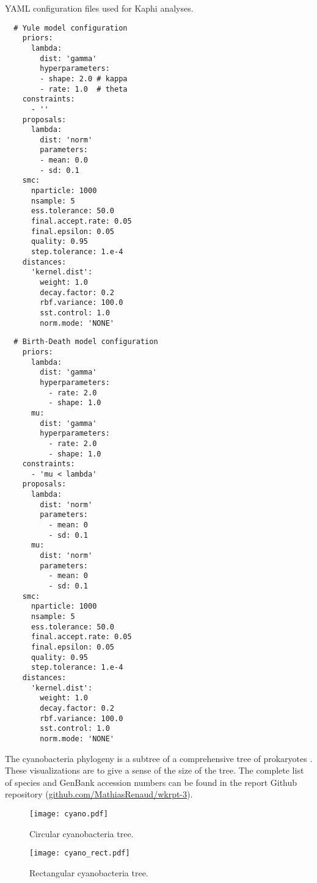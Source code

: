 \documentclass[12pt]{article}
\begin{document}
    
\newpage



\newpage


YAML configuration files used for Kaphi analyses.
\begin{verbatim}
  # Yule model configuration
    priors:
      lambda:
        dist: 'gamma'
        hyperparameters:
        - shape: 2.0 # kappa
        - rate: 1.0  # theta
    constraints:
      - ''
    proposals:
      lambda:
        dist: 'norm'
        parameters:
        - mean: 0.0
        - sd: 0.1
    smc:
      nparticle: 1000
      nsample: 5
      ess.tolerance: 50.0
      final.accept.rate: 0.05
      final.epsilon: 0.05
      quality: 0.95
      step.tolerance: 1.e-4
    distances:
      'kernel.dist':
        weight: 1.0
        decay.factor: 0.2
        rbf.variance: 100.0
        sst.control: 1.0
        norm.mode: 'NONE'
\end{verbatim}

\begin{verbatim}
  # Birth-Death model configuration
    priors:
      lambda:
        dist: 'gamma'
        hyperparameters:
          - rate: 2.0
          - shape: 1.0
      mu:
        dist: 'gamma'
        hyperparameters:
          - rate: 2.0
          - shape: 1.0
    constraints:
      - 'mu < lambda'
    proposals:
      lambda:
        dist: 'norm'
        parameters:
          - mean: 0
          - sd: 0.1
      mu:
        dist: 'norm'
        parameters:
          - mean: 0
          - sd: 0.1
    smc:
      nparticle: 1000
      nsample: 5
      ess.tolerance: 50.0
      final.accept.rate: 0.05
      final.epsilon: 0.05
      quality: 0.95  
      step.tolerance: 1.e-4
    distances:
      'kernel.dist':
        weight: 1.0
        decay.factor: 0.2
        rbf.variance: 100.0
        sst.control: 1.0
        norm.mode: 'NONE'
\end{verbatim}

The cyanobacteria phylogeny is a subtree of a comprehensive tree of prokaryotes \cite{marin2016timetree}. These visualizations are to give a sense of the size of the tree. The complete list of species and GenBank accession numbers can be found in the report Github repository (\url{github.com/MathiasRenaud/wkrpt-3}).

\begin{figure}[ht]
\texttt{[image: cyano.pdf]}
\caption[Circular Cyanobacteria Tree]{Circular cyanobacteria tree.}
\centering
\label{10}
\end{figure}

\begin{figure}[ht]
\texttt{[image: cyano\_rect.pdf]}
\caption[Rectangular Cyanobacteria Tree]{Rectangular cyanobacteria tree.}
\centering
\label{11}
\end{figure}

\newpage
\end{document}
